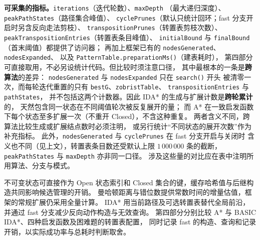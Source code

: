 \textbf{可采集的指标。}\texttt{iterations}（迭代轮数）、\texttt{maxDepth}
（最大递归深度）、\texttt{peakPathStates}（路径集合峰值）、
\texttt{cyclePrunes}（默认只统计回环；fast 分支开启时另含反向走法剪枝）、
\texttt{transpositionPrunes}（转置表剪枝次数）、
\texttt{peakTranspositionEntries}（转置表条目峰值）、
\texttt{initialBound} 与 \texttt{finalBound}（首末阈值）都提供了访问器；
再加上框架已有的 \texttt{nodesGenerated}、\texttt{nodesExpanded}、
以及 \texttt{PatternTable.preparationMs()}（建表耗时），
第四部分可直接取用，不必另设统计代码。但比较时须注意口径，
其中最根本的一条是\textbf{跨算法}的差异：
\texttt{nodesGenerated} 与 \texttt{nodesExpanded} 只在 \texttt{search()} 开头
被清零一次，而每轮迭代重置的只有 \texttt{bestG}、\texttt{zobristTable}、
\texttt{transpositionEntries} 与 \texttt{pathStates}，
并不包括这两个计数器。因此 IDA* 的生成与扩展计数是\textbf{跨轮累计}的，
天然包含同一状态在不同阈值轮次被反复展开的量；
而 A* 在一致启发函数下每个状态至多扩展一次（不重开 Closed），不含这种重复。
两者含义不同，跨算法比较生成或扩展结点数时必须注明，
或另行统计“不同状态的展开次数”作为补充指标。
此外，\texttt{nodesGenerated} 与 \texttt{cyclePrunes} 在 fast 分支开启与关闭时
含义也不同（见上文），转置表条目数还受默认上限 $1\,000\,000$ 条的截断，
\texttt{peakPathStates} 与 \texttt{maxDepth} 亦非同一口径。
涉及这些量的对比应在表中注明所用算法、分支与模式。

不可变状态可直接作为 Open 状态索引和 Closed 集合的键，缓存哈希值与后继构造共同影响候选管理的开销。
曼哈顿距离与错位数提供常数时间的增量估值，框架的常规扩展仍采用全量计算。
IDA* 用当前路径及可选转置表替代全局前沿，并通过 fast 分支减少反向动作构造与无效查询。
第四部分分别比较 A* 与 BASIC IDA*、四种启发函数及困难题的转置表配置，
同时记录 fast 的构造、查询和记录开销，以实际成功率与总耗时判断取舍。
\FloatBarrier
\endgroup




\par\vspace{6bp}
\begingroup
\setlength{\parskip}{3bp}
\setlength{\tabcolsep}{4bp}
\renewcommand{\thefigure}{5-\arabic{figure}}
\renewcommand{\thetable}{5-\arabic{table}}
\renewcommand{\theHfigure}{section5.\arabic{figure}}
\renewcommand{\theHtable}{section5.\arabic{table}}
\setcounter{figure}{0}
\setcounter{table}{0}

